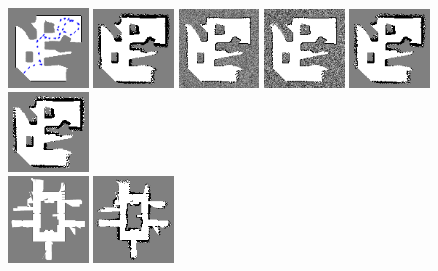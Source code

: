 \documentclass{beamer}
\begin{document}
\begin{frame}
  \includegraphics[width=0.16\textwidth]{../Data/cave_player/gt-final.png}%
  \includegraphics[width=0.16\textwidth]{../Data/cave_player/TwoAssumptionAlgo.png}%
  \includegraphics[width=0.16\textwidth]{../Data/cave_player/SICKSlowMetropolis.png}%
  \includegraphics[width=0.16\textwidth]{../Data/cave_player/SICKDDMCMC.png}%
  \includegraphics[width=0.16\textwidth]{../Data/cave_player/run_belief_propagation.png}%
  \includegraphics[width=0.16\textwidth]{../Data/cave_player/dualdecomposition.png}\\
  \includegraphics[width=0.16\textwidth]{../Data/hospital_player/gt-final.png}%
  \includegraphics[width=0.16\textwidth]{../Data/hospital_player/TwoAssumptionAlgo.png}%

\end{frame}
\end{document}
